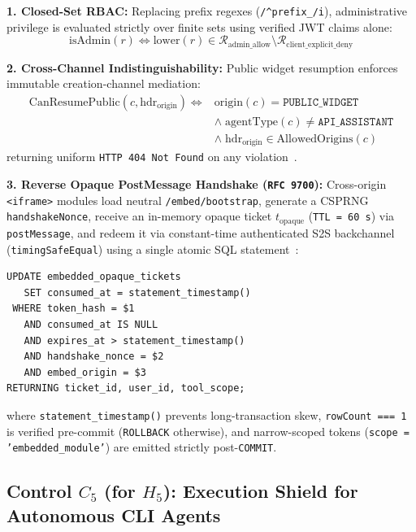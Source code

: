 \documentclass[10pt,twocolumn]{article}
\begin{document}
\textbf{1. Closed-Set RBAC:} Replacing prefix regexes (\texttt{/\^{}prefix\_/i}), administrative privilege is evaluated strictly over finite sets using verified JWT claims alone:
\begin{equation}
\mathrm{isAdmin}(r) \iff \mathrm{lower}(r) \in \mathcal{R}_{\mathrm{admin\_allow}} \setminus \mathcal{R}_{\mathrm{client\_explicit\_deny}}
\end{equation}

\textbf{2. Cross-Channel Indistinguishability:} Public widget resumption enforces immutable creation-channel mediation:
\begin{equation}
\begin{aligned}
\mathrm{CanResumePublic}(c, \mathrm{hdr}_{\mathrm{origin}}) \iff{} & \mathrm{origin}(c) = \texttt{PUBLIC\_WIDGET}\\
&\land\; \mathrm{agentType}(c) \neq \texttt{API\_ASSISTANT}\\
&\land\; \mathrm{hdr}_{\mathrm{origin}} \in \mathrm{AllowedOrigins}(c)
\end{aligned}
\end{equation}
returning uniform \texttt{HTTP 404 Not Found} on any violation~\cite{R01,R05}.

\textbf{3. Reverse Opaque PostMessage Handshake (\texttt{RFC 9700}):} Cross-origin \texttt{<iframe>} modules load neutral \texttt{/embed/bootstrap}, generate a CSPRNG \texttt{handshakeNonce}, receive an in-memory opaque ticket $t_{\mathrm{opaque}}$ (\texttt{TTL = 60 s}) via \texttt{postMessage}, and redeem it via constant-time authenticated S2S backchannel (\texttt{timingSafeEqual}) using a single atomic SQL statement~\cite{R28}:
\begin{lstlisting}
UPDATE embedded_opaque_tickets
   SET consumed_at = statement_timestamp()
 WHERE token_hash = $1
   AND consumed_at IS NULL
   AND expires_at > statement_timestamp()
   AND handshake_nonce = $2
   AND embed_origin = $3
RETURNING ticket_id, user_id, tool_scope;
\end{lstlisting}
where \texttt{statement\_timestamp()} prevents long-transaction skew, \texttt{rowCount === 1} is verified pre-commit (\texttt{ROLLBACK} otherwise), and narrow-scoped tokens (\texttt{scope = 'embedded\_module'}) are emitted strictly post-\texttt{COMMIT}.

\subsection{Control $C_5$ (for $H_5$): Execution Shield for Autonomous CLI Agents}
\end{document}
